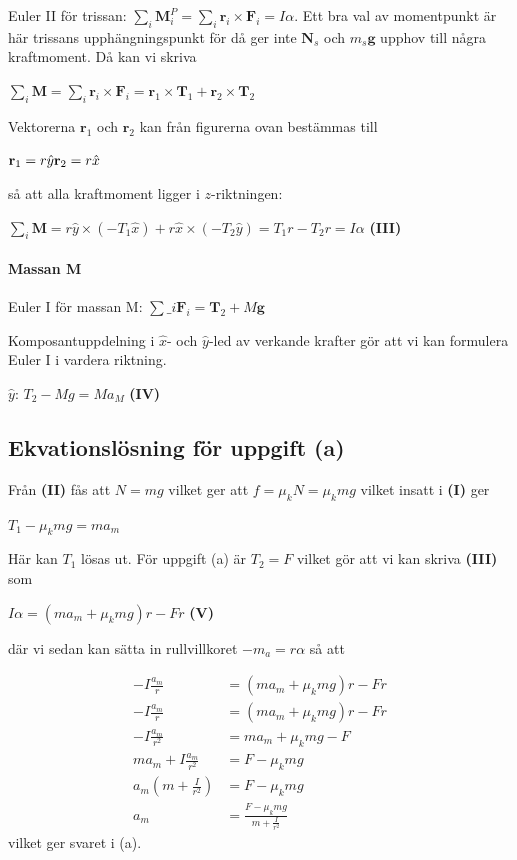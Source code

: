 \documentclass[11pt]{article}
\begin{document}
Euler II för trissan:
\(\sum_i \mathbf{M}^P_i = \sum_i \mathbf{r}_i \times \mathbf{F}_i = I\alpha\).
Ett bra val av momentpunkt är här trissans upphängningspunkt för då ger
inte \(\mathbf{N}_s\) och \(m_s\mathbf{g}\) upphov till några
kraftmoment. Då kan vi skriva

\(\sum_i \mathbf{M} = \sum_i \mathbf{r}_i \times \mathbf{F}_i = \mathbf{r}_1 \times \mathbf{T}_1 + \mathbf{r}_2 \times \mathbf{T}_2\)

Vektorerna \(\mathbf{r}_1\) och \(\mathbf{r}_2\) kan från figurerna ovan
bestämmas till

\(\mathbf{r}_1 = r \hat{y} \\ \mathbf{r}_2 = r \hat{x}\)

så att alla kraftmoment ligger i \(z\)-riktningen:

\(\sum_i \mathbf{M} = r\hat{y} \times (-T_1\hat{x}) + r\hat{x} \times (-T_2 \hat{y}) = T_1 r - T_2 r = I\alpha\)
\textbf{(III)}

\hypertarget{massan-m-1}{%
\paragraph{Massan M}\label{massan-m-1}}

Euler I för massan M: $\sum\_i \mathbf{F}_i = \mathbf{T}_2 + M\mathbf{g}$

Komposantuppdelning i \(\hat{x}\)- och \(\hat{y}\)-led av verkande
krafter gör att vi kan formulera Euler I i vardera riktning.

\(\hat{y}\): \(T_2 - Mg = Ma_M\) \textbf{(IV)}

    \hypertarget{ekvationsluxf6sning-fuxf6r-uppgift-a}{%
\subsection{Ekvationslösning för uppgift
(a)}\label{ekvationsluxf6sning-fuxf6r-uppgift-a}}

Från \textbf{(II)} fås att \(N=mg\) vilket ger att
\(f=\mu_k N = \mu_k mg\) vilket insatt i \textbf{(I)} ger

\(T_1-\mu_k mg = ma_m\)

Här kan \(T_1\) lösas ut. För uppgift (a) är \(T_2=F\) vilket gör att vi
kan skriva \textbf{(III)} som

\(I\alpha = (m a_m+\mu_k mg) r - Fr\) \textbf{(V)}

där vi sedan kan sätta in rullvillkoret \(-m_a=r\alpha\) så att

\begin{align}
-I\frac{a_m}{r} &= (m a_m+\mu_k mg) r - Fr \\
-I\frac{a_m}{r} &= (m a_m+\mu_k mg) r - Fr \\
-I\frac{a_m}{r^2} &= m a_m+\mu_k mg - F \\
 m a_m+I\frac{a_m}{r^2} &= F-\mu_k mg \\
 a_m(m+\frac{I}{r^2}) &= F-\mu_k mg \\
 a_m &= \frac{F-\mu_k mg}{m+\frac{I}{r^2}}
\end{align}
vilket ger svaret i (a).
\end{document}
